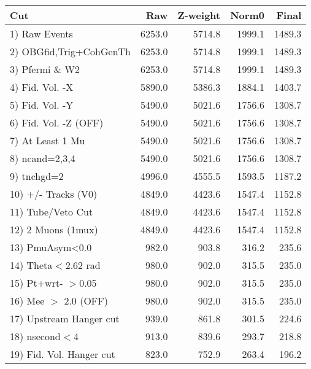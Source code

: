  \begin{table}[h!]\centering
 \begin{tabular}{||l||r|r|r|r||}
 \hline
 \hline
 Cut & Raw & Z-weight & Norm0 & Final \\
 \hline
  1) Raw Events           &      6253.0 &      5714.8 &      1999.1 &      1489.3 \\
  2) OBGfid,Trig+CohGenTh &      6253.0 &      5714.8 &      1999.1 &      1489.3 \\
  3) Pfermi \& W2         &      6253.0 &      5714.8 &      1999.1 &      1489.3 \\
  4) Fid. Vol. -X         &      5890.0 &      5386.3 &      1884.1 &      1403.7 \\
  5) Fid. Vol. -Y         &      5490.0 &      5021.6 &      1756.6 &      1308.7 \\
  6) Fid. Vol. -Z (OFF)   &      5490.0 &      5021.6 &      1756.6 &      1308.7 \\
  7) At Least 1 Mu        &      5490.0 &      5021.6 &      1756.6 &      1308.7 \\
  8) ncand=2,3,4          &      5490.0 &      5021.6 &      1756.6 &      1308.7 \\
  9) tnchgd=2             &      4996.0 &      4555.5 &      1593.5 &      1187.2 \\
 10) +/- Tracks (V0)      &      4849.0 &      4423.6 &      1547.4 &      1152.8 \\
 11) Tube/Veto Cut        &      4849.0 &      4423.6 &      1547.4 &      1152.8 \\
 12) 2 Muons (1mux)       &      4849.0 &      4423.6 &      1547.4 &      1152.8 \\
 13) PmuAsym<0.0          &       982.0 &       903.8 &       316.2 &       235.6 \\
 14) Theta$<$2.62 rad     &       980.0 &       902.0 &       315.5 &       235.0 \\
 15) Pt+wrt- $>$0.05      &       980.0 &       902.0 &       315.5 &       235.0 \\
 16) Mee $>$ 2.0  (OFF)   &       980.0 &       902.0 &       315.5 &       235.0 \\
 17) Upstream Hanger cut  &       939.0 &       861.8 &       301.5 &       224.6 \\
 18) nsecond$<$4          &       913.0 &       839.6 &       293.7 &       218.8 \\
 19) Fid. Vol. Hanger cut &       823.0 &       752.9 &       263.4 &       196.2 \\

\end{tabular}
\end{table}

